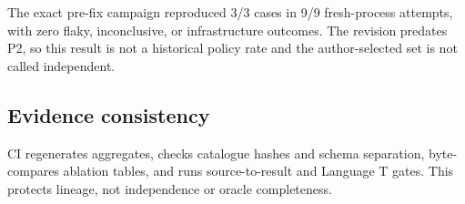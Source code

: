 The exact pre-fix campaign reproduced 3/3 cases in 9/9 fresh-process attempts, with zero flaky, inconclusive, or infrastructure outcomes. The revision predates P2, so this result is not a historical policy rate and the author-selected set is not called independent.

\subsection{Evidence consistency}
CI regenerates aggregates, checks catalogue hashes and schema separation, byte-compares ablation tables, and runs source-to-result and Language T gates. This protects lineage, not independence or oracle completeness.
